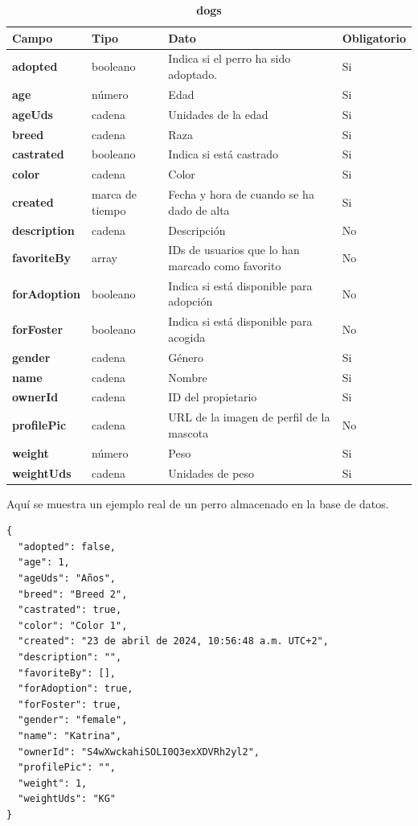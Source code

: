 \documentclass[a4paper, 12pt]{article}
\begin{document}
\begin{table}[H]
\captionsetup{justification=raggedright,singlelinecheck=false}
\caption{\textbf{dogs}}
\label{tab:dogs}
	\begin{tabular}{|m{3cm}|m{2cm}|m{5cm}|m{3cm}|}
	\hline
	\textbf{Campo} & \textbf{Tipo} & \textbf{Dato} & \textbf{Obligatorio} \\ 
	\hline
	\textbf{adopted} & booleano & Indica si el perro ha sido adoptado. & Si \\ 
	\hline
	\textbf{age} & número & Edad & Si \\ 
	\hline
	\textbf{ageUds} & cadena & Unidades de la edad & Si \\ 
	\hline
	\textbf{breed} & cadena & Raza & Si \\ 
	\hline
	\textbf{castrated} & booleano & Indica si está castrado & Si \\ 
	\hline
	\textbf{color} & cadena & Color & Si \\ 
	\hline
	\textbf{created} & marca de tiempo & Fecha y hora de cuando se ha dado de alta & Si \\ 
	\hline
	\textbf{description} & cadena & Descripción & No \\ 
	\hline
	\textbf{favoriteBy} & array & IDs de usuarios que lo han marcado como favorito & No \\ 
	\hline
	\textbf{forAdoption} & booleano & Indica si está disponible para adopción & No \\ 
	\hline
	\textbf{forFoster} & booleano & Indica si está disponible para acogida & No \\ 
	\hline
	\textbf{gender} & cadena & Género & Si \\ 
	\hline
	\textbf{name} & cadena & Nombre & Si \\ 
	\hline
	\textbf{ownerId} & cadena & ID del propietario & Si \\ 
	\hline
	\textbf{profilePic} & cadena & URL de la imagen de perfil de la mascota & No \\ 
	\hline
	\textbf{weight} & número & Peso & Si \\ 
	\hline
	\textbf{weightUds} & cadena & Unidades de peso & Si \\ 
	\hline
\end{tabular}
\end{table}

Aquí se muestra un ejemplo real de un perro almacenado en la base de datos.

\begin{verbatim}
{
  "adopted": false,
  "age": 1,
  "ageUds": "Años",
  "breed": "Breed 2",
  "castrated": true,
  "color": "Color 1",
  "created": "23 de abril de 2024, 10:56:48 a.m. UTC+2",
  "description": "",
  "favoriteBy": [],
  "forAdoption": true,
  "forFoster": true,
  "gender": "female",
  "name": "Katrina",
  "ownerId": "S4wXwckahiSOLI0Q3exXDVRh2yl2",
  "profilePic": "",
  "weight": 1,
  "weightUds": "KG"
}
\end{verbatim}
\end{document}
